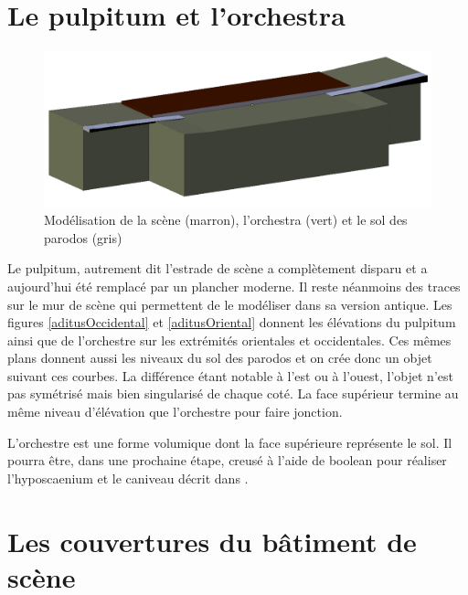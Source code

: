 \section{Le pulpitum et l'orchestra} 

\begin{figure}[!h]
	\includegraphics[width=\linewidth]{images/modOrchestre}
	\caption[Modélisation de la scène, l'\gls{orchestra} et le sol des \gls{parodos}]{Modélisation de la scène (marron), l'\gls{orchestra} (vert) et le sol des \gls{parodos} (gris)} 
	\label{modOrchestre} 
\end{figure} 

Le pulpitum, autrement dit l'estrade de scène a complètement disparu et a aujourd'hui été remplacé par un plancher moderne. Il reste néanmoins des traces sur le mur de scène qui permettent de le modéliser dans sa version antique. Les figures \ref{aditusOccidental} et \ref{aditusOriental} donnent les élévations du pulpitum ainsi que de l'orchestre sur les extrémités orientales et occidentales. Ces mêmes plans donnent aussi les niveaux du sol des \gls{parodos} et on crée donc un objet suivant ces courbes. La différence étant notable à l'est ou à l'ouest, l'objet n'est pas symétrisé mais bien singularisé de chaque coté. La face supérieur termine au même niveau d'élévation que l'orchestre pour faire jonction.

L'orchestre est une forme volumique dont la face supérieure représente le sol. Il pourra être, dans une prochaine étape, creusé à l'aide de \gls{boolean} pour réaliser l'hyposcaenium et le caniveau décrit dans \cite[Chap. VI]{orangeTxt}. 

\section{Les couvertures du bâtiment de scène}
\label{sect-couverture}

